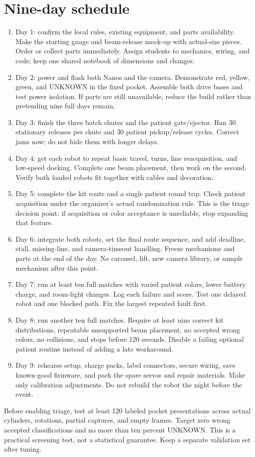 \documentclass[10pt,a4paper]{article}
\begin{document}
\section{Nine-day schedule}
\begin{enumerate}
\item Day 1: confirm the local rules, existing equipment, and parts availability. Make the starting gauge and beam-release mock-up with actual-size pieces. Order or collect parts immediately. Assign students to mechanics, wiring, and code; keep one shared notebook of dimensions and changes.
\item Day 2: power and flash both Nanos and the camera. Demonstrate red, yellow, green, and UNKNOWN in the fixed pocket. Assemble both drive bases and test power isolation. If parts are still unavailable, reduce the build rather than pretending nine full days remain.
\item Day 3: finish the three batch chutes and the patient gate/ejector. Run 30 stationary releases per chute and 30 patient pickup/release cycles. Correct jams now; do not hide them with longer delays.
\item Day 4: get each robot to repeat basic travel, turns, line reacquisition, and low-speed docking. Complete one beam placement, then work on the second. Verify both loaded robots fit together with cables and decoration.
\item Day 5: complete the kit route and a single patient round trip. Check patient acquisition under the organizer's actual randomization rule. This is the triage decision point: if acquisition or color acceptance is unreliable, stop expanding that feature.
\item Day 6: integrate both robots, set the final route sequence, and add deadline, stall, missing-line, and camera-timeout handling. Freeze mechanisms and parts at the end of the day. No carousel, lift, new camera library, or sample mechanism after this point.
\item Day 7: run at least ten full matches with varied patient colors, lower battery charge, and room-light changes. Log each failure and score. Test one delayed robot and one blocked path. Fix the largest repeated fault first.
\item Day 8: run another ten full matches. Require at least nine correct kit distributions, repeatable unsupported beam placement, no accepted wrong colors, no collisions, and stops before 120 seconds. Disable a failing optional patient routine instead of adding a late workaround.
\item Day 9: rehearse setup, charge packs, label connectors, secure wiring, save known-good firmware, and pack the spare servos and repair materials. Make only calibration adjustments. Do not rebuild the robot the night before the event.
\end{enumerate}
Before enabling triage, test at least 120 labeled pocket presentations across actual cylinders, rotations, partial captures, and empty frames. Target zero wrong accepted classifications and no more than ten percent UNKNOWN. This is a practical screening test, not a statistical guarantee. Keep a separate validation set after tuning.
\end{document}
